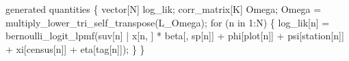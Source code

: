 \documentclass[
  12pt,
  letterpaper,
  DIV=11,
  numbers=noendperiod]{scrartcl}
\newenvironment{Shaded}{\begin{snugshade}}{\end{snugshade}}
\newcommand{\ControlFlowTok}[1]{\textcolor[rgb]{0.00,0.23,0.31}{#1}}
\newcommand{\DataTypeTok}[1]{\textcolor[rgb]{0.68,0.00,0.00}{#1}}
\newcommand{\DecValTok}[1]{\textcolor[rgb]{0.68,0.00,0.00}{#1}}
\newcommand{\KeywordTok}[1]{\textcolor[rgb]{0.00,0.23,0.31}{#1}}
\newcommand{\NormalTok}[1]{\textcolor[rgb]{0.00,0.23,0.31}{#1}}
\begin{document}
\begin{Shaded}
\begin{Highlighting}[]
\KeywordTok{generated quantities}\NormalTok{ \{}
  \DataTypeTok{vector}\NormalTok{[N] log\_lik;}
  \DataTypeTok{corr\_matrix}\NormalTok{[K] Omega;}
\NormalTok{  Omega = multiply\_lower\_tri\_self\_transpose(L\_Omega);}
  \ControlFlowTok{for}\NormalTok{ (n }\ControlFlowTok{in} \DecValTok{1}\NormalTok{:N) \{}
\NormalTok{    log\_lik[n] = bernoulli\_logit\_lpmf(suv[n] | x[n, ] * beta[, sp[n]] +}
\NormalTok{      phi[plot[n]] + psi[station[n]] + xi[census[n]] + eta[tag[n]]);}
\NormalTok{  \}}
\NormalTok{\}}
\end{Highlighting}
\end{Shaded}
\end{document}
